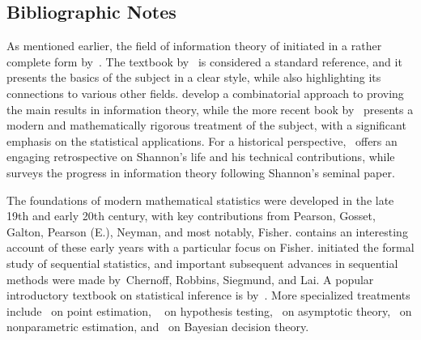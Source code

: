 \documentclass[12pt]{article}
\begin{document}
\subsection*{Bibliographic Notes}
As mentioned earlier, the field of information theory of initiated in a rather complete form by~\citet{shannon1948mathematical}. The textbook by~\citet{cover2006elements} is considered a standard reference, and it presents the basics of the subject in a clear style, while also highlighting its connections to various other fields. \citet{csiszar2011information} develop a combinatorial approach to proving the main results in information theory, while the more recent book by~\citet{polyanskiy2025information} presents a modern and mathematically rigorous treatment of the subject, with a significant emphasis on the statistical applications. 
For a historical perspective,~\citet{gallager2002claude} offers an engaging retrospective on Shannon's life and his technical contributions, while~\citet{verdu1998fifty} surveys the progress in information theory following Shannon's seminal paper. 



The foundations of modern mathematical statistics were developed in the late 19th and early 20th century, with key contributions from Pearson, Gosset, Galton,  Pearson (E.), Neyman, and most notably, Fisher. \citet{rao1992ra} contains an interesting account of these early years with a particular focus on Fisher.  \citet{wald1945sequential}  initiated the formal study of sequential statistics, and important subsequent advances in sequential methods were made by~Chernoff, Robbins, Siegmund, and Lai. 
A popular introductory textbook on statistical inference is by~\citet{casella2024statistical}. More specialized treatments include~\citep{lehmann1998theory} on point estimation, ~\citep{lehmann2005testing} on hypothesis testing,~\citet{van2000asymptotic} on asymptotic theory,~\citet{tsybakov2009nonparametric} on nonparametric estimation, and~\citet{berger2013statistical} on Bayesian decision theory. 

\end{document}
